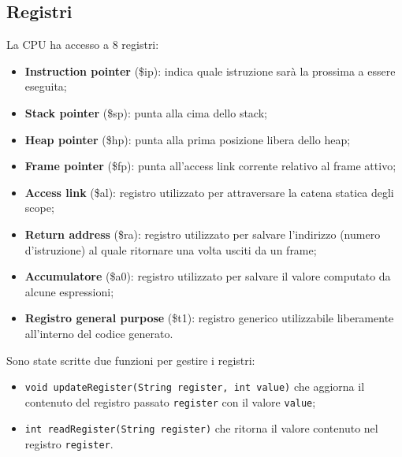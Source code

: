 \documentclass[../report.tex]{subfiles}
\begin{document}
\subsection{Registri}\label{ss:registri}
La CPU ha accesso a 8 registri:
\begin{itemize}
    \item \textbf{Instruction pointer} (\$ip): indica quale istruzione sar\`a la prossima a essere eseguita;
    \item \textbf{Stack pointer} (\$sp): punta alla cima dello stack;
    \item \textbf{Heap pointer} (\$hp): punta alla prima posizione libera dello heap;
    \item \textbf{Frame pointer} (\$fp): punta all'access link corrente relativo al frame attivo;
    \item \textbf{Access link} (\$al): registro utilizzato per attraversare la catena statica degli scope;
    \item \textbf{Return address} (\$ra): registro utilizzato per salvare l'indirizzo (numero d'istruzione) al quale ritornare una volta usciti da un frame;
    \item \textbf{Accumulatore} (\$a0): registro utilizzato per salvare il valore computato da alcune espressioni;
    \item \textbf{Registro general purpose} (\$t1): registro generico utilizzabile liberamente all'interno del codice generato.
\end{itemize}
Sono state scritte due funzioni per gestire i registri:
\begin{itemize}
    \item \verb|void updateRegister(String register, int value)| che aggiorna il contenuto del registro passato \verb|register| con il valore \verb|value|;
    \item \verb|int readRegister(String register)| che ritorna il valore contenuto nel registro \verb|register|.
\end{itemize}
\end{document}
